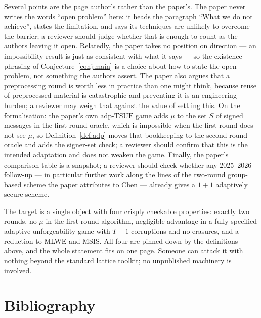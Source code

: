 \documentclass{aicr-conjecture}
\newcommand{\TSUF}{\mathrm{adp}\text{-}\mathrm{TSUF}}
\begin{document}
\begin{remark}\label{rem:readings}
Several points are the page author's rather than the paper's. The paper
never writes the words ``open problem'' here: it heads the paragraph
``What we do not achieve'', states the limitation, and says its
techniques are unlikely to overcome the barrier; a reviewer should
judge whether that is enough to count as the authors leaving it open.
Relatedly, the paper takes no position on direction --- an
impossibility result is just as consistent with what it says --- so the
existence phrasing of Conjecture~\ref{conj:main} is a choice about how
to state the open problem, not something the authors assert. The paper
also argues that a preprocessing round is worth less in practice than
one might think, because reuse of preprocessed material is catastrophic
and preventing it is an engineering burden; a reviewer may weigh that
against the value of settling this. On the formalisation: the paper's
own $\TSUF$ game adds $\mu$ to the set $S$ of signed messages in the
first-round oracle, which is impossible when the first round does not
see $\mu$, so Definition~\ref{def:adp} moves that bookkeeping to the
second-round oracle and adds the signer-set check; a reviewer should
confirm that this is the intended adaptation and does not weaken the
game. Finally, the paper's comparison table is a snapshot; a reviewer
should check whether any 2025--2026 follow-up --- in particular further
work along the lines of the two-round group-based scheme the paper
attributes to Chen --- already gives a $1+1$ adaptively secure scheme.
\end{remark}

\begin{remark}\label{rem:clean}
The target is a single object with four crisply checkable properties:
exactly two rounds, no $\mu$ in the first-round algorithm, negligible
advantage in a fully specified adaptive unforgeability game with $T-1$
corruptions and no erasures, and a reduction to MLWE and MSIS. All four
are pinned down by the definitions above, and the whole statement fits
on one page. Someone can attack it with nothing beyond the standard
lattice toolkit; no unpublished machinery is involved.
\end{remark}

\section{Bibliography}
\end{document}
